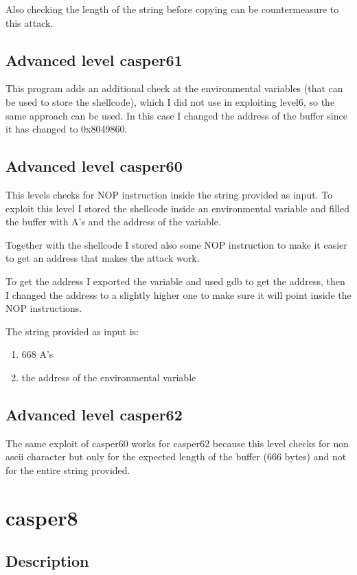\documentclass[a4paper,12pt]{article}
\begin{document}
Also checking the length of the string before copying can be countermeasure to this attack.

\subsection{Advanced level casper61}

This program adds an additional check at the environmental variables (that can be used to store the shellcode), which I did not use in exploiting level6, so the same approach can be used. In this case I changed the address of the buffer since it has changed to 0x8049860.

\subsection{Advanced level casper60}

This levels checks for NOP instruction inside the string provided as input. To exploit this level I stored the shellcode inside an environmental variable and filled the buffer with A's and the address of the variable.

Together with the shellcode I stored also some NOP instruction to make it easier to get an address that makes the attack work.

To get the address I exported the variable and used gdb to get the address, then I changed the address to a slightly higher one to make sure it will point inside the NOP instructions.

The string provided as input is:
\begin{enumerate}
\item 668 A's
\item the address of the environmental variable 
\end{enumerate}

\subsection{Advanced level casper62}

The same exploit of casper60 works for casper62 because this level checks for non ascii character but only for the expected length of the buffer (666 bytes) and not for the entire string provided.

\section{casper8}
\subsection{Description}
\end{document}
